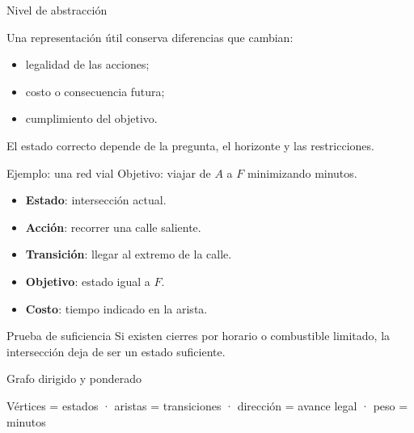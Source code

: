 \documentclass[aspectratio=169,11pt]{beamer}
\newcommand{\concepto}[1]{\textcolor{UAPTeal}{\textbf{#1}}}
\begin{document}
\begin{frame}{Nivel de abstracción}
  \centering
  \vfill
  Una representación útil conserva diferencias que cambian:
  \begin{itemize}
    \item legalidad de las acciones;
    \item costo o consecuencia futura;
    \item cumplimiento del objetivo.
  \end{itemize}
  \alert{El estado correcto depende de la pregunta, el horizonte y las restricciones.}
\end{frame}

\begin{frame}{Ejemplo: una red vial}
  Objetivo: viajar de $A$ a $F$ minimizando minutos.
  \begin{itemize}
    \item \concepto{Estado}: intersección actual.
    \item \concepto{Acción}: recorrer una calle saliente.
    \item \concepto{Transición}: llegar al extremo de la calle.
    \item \concepto{Objetivo}: estado igual a $F$.
    \item \concepto{Costo}: tiempo indicado en la arista.
  \end{itemize}
  \begin{block}{Prueba de suficiencia}
    Si existen cierres por horario o combustible limitado, la intersección deja de ser un estado suficiente.
  \end{block}
\end{frame}

\begin{frame}{Grafo dirigido y ponderado}
  \centering
  \vfill
  Vértices = estados · aristas = transiciones · dirección = avance legal · peso = minutos
\end{frame}
\end{document}
